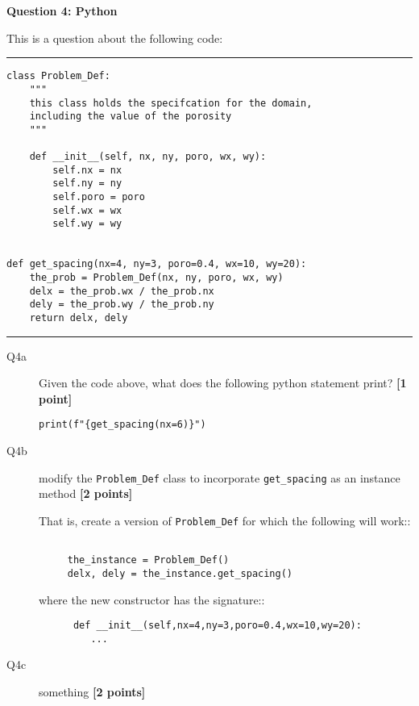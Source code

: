 \documentclass{article}
\begin{document}
\textbf{Question 4: Python}


This is a question about the following code:

\rule{15cm}{0.75pt}


\begin{verbatim}
class Problem_Def:
    """
    this class holds the specifcation for the domain,
    including the value of the porosity
    """

    def __init__(self, nx, ny, poro, wx, wy):
        self.nx = nx
        self.ny = ny
        self.poro = poro
        self.wx = wx
        self.wy = wy


def get_spacing(nx=4, ny=3, poro=0.4, wx=10, wy=20):
    the_prob = Problem_Def(nx, ny, poro, wx, wy)
    delx = the_prob.wx / the_prob.nx
    dely = the_prob.wy / the_prob.ny
    return delx, dely
\end{verbatim}

\rule{15cm}{0.75pt}

\begin{description}

\item[Q4a] Given the code above, what does the following python statement print?
  \textbf{[1 point]}
  
\verb+print(f"{get_spacing(nx=6)}")+

\vspace{1.5cm}
  
\end{description}


\begin{description}  

  
\item[Q4b] modify the \verb+Problem_Def+ class to
  incorporate \verb+get_spacing+ as an instance method \textbf{[2 points]}

  That is, create a version of \verb+Problem_Def+ for which the following will work::

\begin{verbatim}

     the_instance = Problem_Def()
     delx, dely = the_instance.get_spacing()

\end{verbatim}

where the new constructor has the signature::

\begin{verbatim}
      def __init__(self,nx=4,ny=3,poro=0.4,wx=10,wy=20):
         ...
\end{verbatim}

\item[Q4c] something \textbf{[2 points]}

  
\end{description}  
\end{document}

